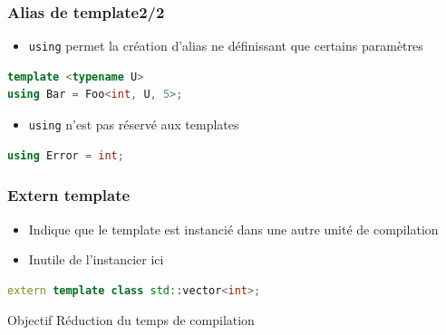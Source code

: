 \documentclass[C++.tex]{subfiles}
\begin{document}
\begin{frame}[fragile]
	\frametitle{Alias de template\titlehfill{}2/2}
	\begin{itemize}
		\item \lstinline|using| permet la création d'alias ne définissant que certains paramètres
	\end{itemize}

	\begin{lstlisting}[language=C++]
template <typename U>
using Bar = Foo<int, U, 5>;\end{lstlisting}

	\pause

	\begin{itemize}
		\item \lstinline|using| n'est pas réservé aux templates
	\end{itemize}


	\begin{lstlisting}[language=C++]
using Error = int;\end{lstlisting}
\end{frame}

\begin{frame}[fragile]
	\frametitle{Extern template}
	\begin{itemize}
		\item Indique que le template est instancié dans une autre unité de compilation
		\item Inutile de l'instancier ici
	\end{itemize}

	\begin{lstlisting}[language=C++]
extern template class std::vector<int>;\end{lstlisting}

	\begin{block}{Objectif}
		Réduction du temps de compilation
	\end{block}
\end{frame}
\end{document}
